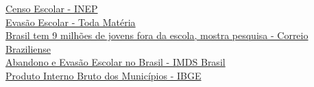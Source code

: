     \href{https://www.gov.br/inep/pt-br/areas-de-atuacao/pesquisas-estatisticas-e-indicadores/censo-escolar}{Censo Escolar - INEP}\\
    \href{https://www.todamateria.com.br/evasao-escolar/}{Evasão Escolar - Toda Matéria}\\
    \href{https://www.correiobraziliense.com.br/euestudante/educacao-basica/2024/03/6816745-brasil-tem-9-milhoes-de-jovens-fora-da-escola-mostra-pesquisa.html}{Brasil tem 9 milhões de jovens fora da escola, mostra pesquisa - Correio Braziliense}\\
    \href{https://imdsbrasil.org/publicacao/abandono-e-evasao-escolar-no-brasil/}{Abandono e Evasão Escolar no Brasil - IMDS Brasil}\\
    \href{https://www.ibge.gov.br/estatisticas/economicas/contas-nacionais/9088-produto-interno-bruto-dos-municipios.html?=\&t=downloads}{Produto Interno Bruto dos Municípios - IBGE}